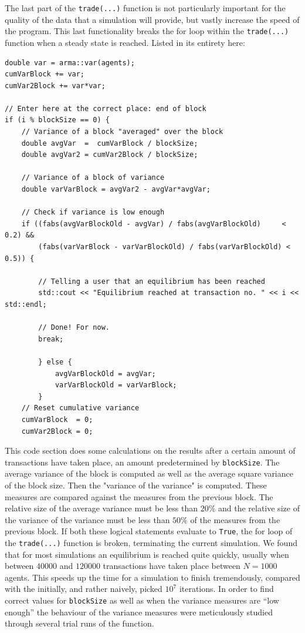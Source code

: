 \documentclass[10pt, a4paper]{amsart}
\begin{document}
The last part of the \lstinline|trade(...)| function is not particularly important for the quality of the data that a simulation will provide, but vastly increase the speed of the program. This last functionality breaks the for loop within the \lstinline|trade(...)| function when a steady state is reached. Listed in its entirety here:
\begin{lstlisting}
double var = arma::var(agents);
cumVarBlock += var;
cumVar2Block += var*var;

// Enter here at the correct place: end of block
if (i % blockSize == 0) {
	// Variance of a block "averaged" over the block
	double avgVar  =  cumVarBlock / blockSize;
	double avgVar2 = cumVar2Block / blockSize;

	// Variance of a block of variance
	double varVarBlock = avgVar2 - avgVar*avgVar;

	// Check if variance is low enough
	if ((fabs(avgVarBlockOld - avgVar) / fabs(avgVarBlockOld)     < 0.2) &&
		(fabs(varVarBlock - varVarBlockOld) / fabs(varVarBlockOld) < 0.5)) {

		// Telling a user that an equilibrium has been reached
		std::cout << "Equilibrium reached at transaction no. " << i << std::endl;

		// Done! For now.
		break;

		} else {
			avgVarBlockOld = avgVar;
			varVarBlockOld = varVarBlock;
		}
	// Reset cumulative variance
	cumVarBlock  = 0;
	cumVar2Block = 0;
\end{lstlisting}
This code section does some calculations on the results after a certain amount of transactions have taken place, an amount predetermined by \lstinline|blockSize|. The average variance of the block is computed as well as the average square variance of the block size. Then the "variance of the variance" is computed. These measures are compared against the measures from the previous block. The relative size of the average variance must be less than $20\%$ and the relative size of the variance of the variance must be less than $50\%$ of the measures from the previous block. If both these logical statements evaluate to \lstinline|True|, the for loop of the \lstinline|trade(...)| function is broken, terminating the current simulation. We found that for most simulations an equilibrium is reached quite quickly, usually when between $40000$ and $120000$ transactions have taken place between $N=1000$ agents. This speeds up the time for a simulation to finish tremendously, compared with the initially, and rather naively, picked $10^7$ iterations. In order to find correct values for \lstinline|blockSize| as well as when the variance measures are ``low enough'' the behaviour of the variance measures were meticulously studied through several trial runs of the function.
\end{document}
